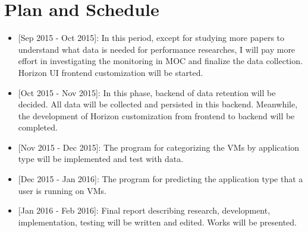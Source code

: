 \section{Plan and Schedule}
\label{sec:Plan}

\begin{itemize}
\item{[Sep 2015 - Oct 2015]:} In this period, except for studying more papers to understand what data is needed for performance researches, I will pay more effort in investigating the monitoring in MOC and finalize the data collection. Horizon UI frontend customization will be started.
\item{[Oct 2015 - Nov 2015]:} In this phase, backend of data retention will be decided. All data will be collected and persisted in this backend. Meanwhile, the development of Horizon customization from frontend to backend will be completed.
\item{[Nov 2015 - Dec 2015]:} The program for categorizing the VMs by application type will be implemented and test with data.
\item{[Dec 2015 - Jan 2016]:} The program for predicting the application type that a user is running on VMs. 
\item{[Jan 2016 - Feb 2016]:} Final report describing research, development, implementation, testing will be written and edited. Works will be presented.
\end{itemize}
